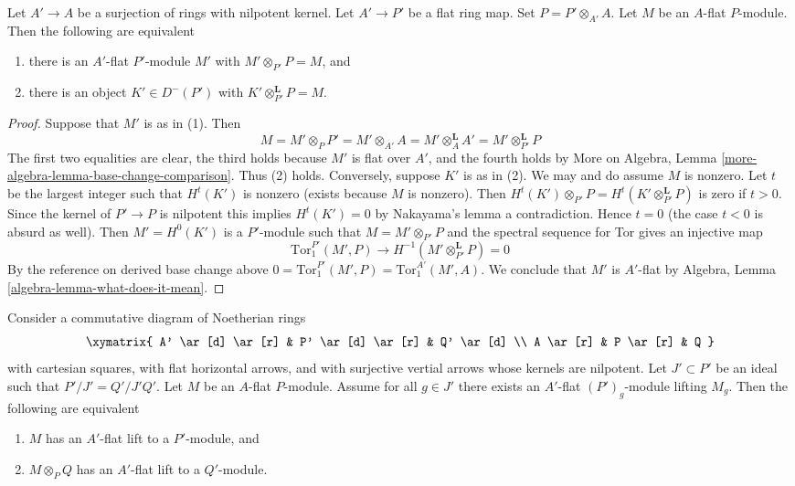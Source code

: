 \begin{lemma}
\label{lemma-lift-equivalence-module-derived}
Let $A' \to A$ be a surjection of rings with nilpotent kernel.
Let $A' \to P'$ be a flat ring map.
Set $P = P' \otimes_{A'} A$.
Let $M$ be an $A$-flat $P$-module.
Then the following are equivalent
\begin{enumerate}
\item there is an $A'$-flat $P'$-module $M'$ with
$M' \otimes_{P'} P = M$, and
\item there is an object $K' \in D^-(P')$ with
$K' \otimes_{P'}^\mathbf{L} P = M$.
\end{enumerate}
\end{lemma}

\begin{proof}
Suppose that $M'$ is as in (1). Then
$$
M = M' \otimes_P P' = M' \otimes_{A'} A =
M' \otimes_A^\mathbf{L} A' = M' \otimes_{P'}^\mathbf{L} P
$$
The first two equalities are clear, the third holds because
$M'$ is flat over $A'$, and the fourth holds by
More on Algebra, Lemma \ref{more-algebra-lemma-base-change-comparison}.
Thus (2) holds. Conversely, suppose $K'$ is as in (2).
We may and do assume $M$ is nonzero.
Let $t$ be the largest integer such that $H^t(K')$ is nonzero
(exists because $M$ is nonzero).
Then $H^t(K') \otimes_{P'} P = H^t(K' \otimes_{P'}^\mathbf{L} P)$
is zero if $t > 0$. Since the kernel of $P' \to P$ is nilpotent
this implies $H^t(K') = 0$ by Nakayama's lemma a contradiction.
Hence $t = 0$ (the case $t < 0$ is absurd as well).
Then $M' = H^0(K')$ is a $P'$-module such that $M = M' \otimes_{P'} P$
and the spectral sequence for Tor gives an injective map
$$
\text{Tor}_1^{P'}(M', P) \to H^{-1}(M' \otimes_{P'}^\mathbf{L} P) = 0
$$
By the reference on derived base change above
$0 = \text{Tor}_1^{P'}(M', P) = \text{Tor}_1^{A'}(M', A)$.
We conclude that $M'$ is $A'$-flat by
Algebra, Lemma \ref{algebra-lemma-what-does-it-mean}.
\end{proof}

\begin{lemma}
\label{lemma-lift-equivalence-module}
Consider a commutative diagram of Noetherian rings
$$
\xymatrix{
A' \ar[d] \ar[r] &
P' \ar[d] \ar[r] &
Q' \ar[d] \\
A \ar[r] &
P \ar[r] &
Q
}
$$
with cartesian squares, with flat horizontal arrows, and with
surjective vertial arrows whose kernels are nilpotent.
Let $J' \subset P'$ be an ideal such that $P'/J' = Q'/J'Q'$.
Let $M$ be an $A$-flat $P$-module.
Assume for all $g \in J'$ there exists an $A'$-flat $(P')_g$-module
lifting $M_g$. Then the following are equivalent
\begin{enumerate}
\item $M$ has an $A'$-flat lift to a $P'$-module, and
\item $M \otimes_P Q$ has an $A'$-flat lift to a $Q'$-module.
\end{enumerate}
\end{lemma}

